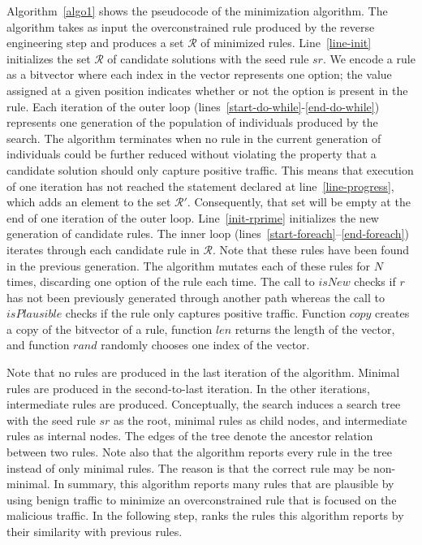 \documentclass[sigconf,review, anonymous]{acmart}
\begin{document}
Algorithm~\ref{algo1} shows the pseudocode of the \tname{}
minimization algorithm. The algorithm takes as input the
overconstrained rule produced by the reverse engineering step and
produces a set $\mathcal R$ of minimized rules. Line~\ref{line-init}
initializes the set $\mathcal{R}$ of candidate solutions with the seed
rule $sr$. We encode a rule as a bitvector where each index in the
vector represents one option; the value assigned at a given position
indicates whether or not the option is present in the rule. Each
iteration of the outer loop
(lines~\ref{start-do-while}-\ref{end-do-while}) represents one
generation of the population of individuals produced by the
search. The algorithm terminates when no rule in the current
generation of individuals could be further reduced without violating
the property that a candidate solution should only capture positive
traffic. This means that execution of one iteration has not reached
the statement declared at line~\ref{line-progress}, which adds an
element to the set $\mathcal{R'}$. Consequently, that set will be
empty at the end of one iteration of the outer
loop. Line~\ref{init-rprime} initializes the new generation of
candidate rules. The inner loop
(lines~\ref{start-foreach}--\ref{end-foreach}) iterates through each
candidate rule in $\mathcal R$. Note that these rules have been found
in the previous generation. The algorithm mutates each of these rules
for $N$ times, discarding one option of the rule each time. The call
to $\mathit{isNew}$ checks if $r$ has not been previously generated
through another path whereas the call to $\mathit{isPlausible}$ checks
if the rule only captures positive traffic. Function $\mathit{copy}$
creates a copy of the bitvector of a rule, function $\mathit{len}$
returns the length of the vector, and function $\mathit{rand}$
randomly chooses one index of the vector.

Note that no rules are produced in the last iteration of the
algorithm. Minimal rules are produced in the second-to-last
iteration. In the other iterations, intermediate rules are
produced. Conceptually, the search induces a search tree with the seed
rule $sr$ as the root, minimal rules as child nodes, and intermediate
rules as internal nodes. The edges of the tree denote the ancestor
relation between two rules. Note also that the algorithm reports every
rule in the tree instead of only minimal rules. The reason is that the
correct rule may be non-minimal. In summary, this algorithm reports
many rules that are plausible by using benign traffic to minimize an
overconstrained rule that is focused on the malicious traffic. In the
following step, \tname{} ranks the rules this algorithm reports by
their similarity with previous rules.
\end{document}
